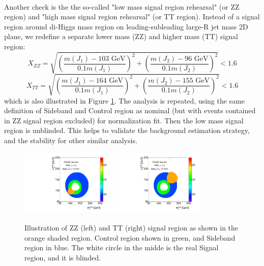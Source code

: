\paragraph{}
Another check is the the so-called "low mass signal region rehearsal" (or ZZ region) and "high mass signal region rehearsal" (or TT region). Instead of a signal region around di-Higgs mass region on leading-subleading large-R jet mass 2D plane, we redefine a separate lower mass (ZZ) and higher mass (TT) signal region: 
\begin{equation}
X_{ZZ} = \sqrt{\left(\frac{m(J_1) - \text{103 GeV}}{0.1 m(J_1)}\right)^2 + \left(\frac{m(J_2) - \text{96 GeV}}{0.1 m(J_2)}\right)^2} < 1.6 
\label{eq:boosted_Xzz}
\end{equation}
\begin{equation}
X_{TT} = \sqrt{\left(\frac{m(J_1) - \text{164 GeV}}{0.1 m(J_1)}\right)^2 + \left(\frac{m(J_2) - \text{155 GeV}}{0.1 m(J_2)}\right)^2} < 1.6
\label{eq:boosted_Xtt}
\end{equation}
which is also illustrated in Figure \ref{CRSB:ZZIllustration}. The analysis is repeated, using the same definition of Sideband and Control region as nominal (but with events contained in ZZ signal region excluded) for normalization fit. Then the low mass signal region is unblinded. This helps to validate the background estimation strategy, and the stability for other similar analysis.

\begin{figure}[htbp!]
\begin{center}
\includegraphics[angle=270, width=0.4\textwidth]{./figures/boosted/ZZ/Compare_NoTag_mH0H1.pdf}
\includegraphics[angle=270, width=0.4\textwidth]{./figures/boosted/TT/Compare_NoTag_mH0H1.pdf}
\end{center}
\caption{Illustration of ZZ (left) and TT (right) signal region as shown in the orange shaded region. Control region shown in green, and Sideband region in blue. The white circle in the midde is the real Signal region, and it is blinded.}
\label{CRSB:ZZIllustration}
\end{figure}

